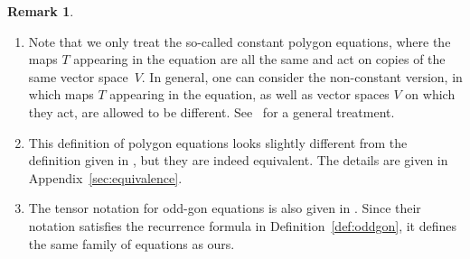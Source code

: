 \documentclass[pdftex]{sigma}
\numberwithin{equation}{section}
\theoremstyle{definition}
\newtheorem{Remark}[Theorem]{Remark}
\begin{document}
\begin{Remark}\label{rem:translation}\quad
\begin{enumerate}\itemsep=0pt
 \item Note that we only treat the so-called constant polygon equations, where the maps $T$ appearing in the equation are all the same and act on copies of the same vector space~$V$.
 In general, one can consider the non-constant version, in which maps $T$ appearing in the equation, as well as vector spaces $V$ on which they act, are allowed to be different. See~\cite{dimakis2015simplex} for a general treatment.
 \item This definition of polygon equations looks slightly different from the definition given in \cite[Section~4.2]{dimakis2015simplex}, but they are indeed equivalent. The details are given in Appendix~\ref{sec:equivalence}.
 \item The tensor notation for odd-gon equations is also given in \cite[Proposition~3]{dimakis2021grassmannian}. Since their notation satisfies the recurrence formula in Definition~\ref{def:oddgon}, it defines the same family of equations as ours.
\end{enumerate}
\end{Remark}
\end{document}
